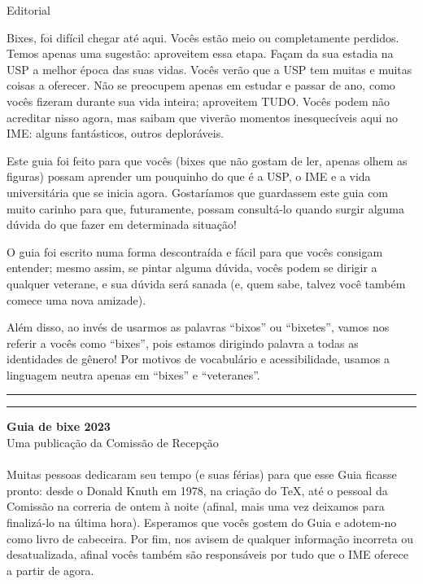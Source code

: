\begin{editorial}{Editorial}

Bixes, foi difícil chegar até aqui. Vocês
estão meio ou completamente perdidos. Temos apenas uma sugestão: aproveitem essa
etapa. Façam da sua estadia na USP a melhor época das suas vidas. Vocês verão
que a USP tem muitas e muitas coisas a oferecer. Não se preocupem apenas em
estudar e passar de ano, como vocês fizeram durante sua vida inteira; aproveitem
TUDO. Vocês podem não acreditar nisso agora, mas saibam que viverão momentos
inesquecíveis aqui no IME: alguns fantásticos, outros deploráveis.

Este guia foi feito para que vocês (bixes que não gostam de ler, apenas olhem as figuras)
possam aprender um pouquinho do que é a USP,
o IME e a vida universitária que se inicia agora. 
Gostaríamos que guardassem este guia com muito carinho para que, futuramente, possam consultá-lo
quando surgir alguma dúvida do que fazer em determinada situação!

O guia foi escrito numa forma
descontraída e fácil para que vocês consigam entender; mesmo assim, se pintar
alguma dúvida, vocês podem se dirigir a qualquer veterane, e sua dúvida será
sanada (e, quem sabe, talvez você também comece uma nova amizade).

Além disso, ao invés de usarmos as palavras ``bixos'' ou ``bixetes'', vamos nos referir
a vocês como ``bixes'', pois estamos dirigindo palavra a todas as identidades de 
gênero! Por motivos de vocabulário e acessibilidade, usamos a linguagem neutra 
apenas em ``bixes'' e ``veteranes''.


\rule{\textwidth}{0.5ex}\rule{2ex}{0.5ex}

{\large\bf Guia de bixe 2023} \\
Uma publicação da Comissão de Recepção

\paragraph{}
Muitas pessoas dedicaram seu tempo (e suas férias) para que esse Guia ficasse
pronto: desde o Donald Knuth em 1978, na criação do \TeX\makebox{}, até o
pessoal da Comissão na correria de ontem à noite (afinal, mais uma vez
deixamos para finalizá-lo na última hora). Esperamos que vocês gostem do Guia
e adotem-no como livro de cabeceira. Por fim, nos avisem de qualquer informação
incorreta ou desatualizada, afinal vocês também são responsáveis por tudo que o
IME oferece a partir de agora.


\end{editorial}
